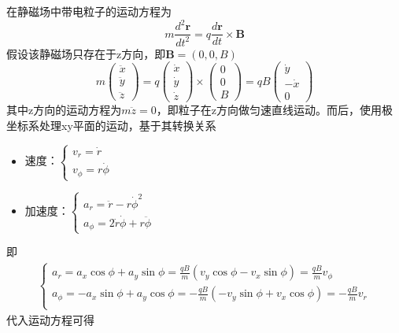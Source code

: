 在静磁场中带电粒子的运动方程为
\begin{equation*}
    m\frac{d^2\mathbf{r}}{dt^2}=q\frac{d\mathbf{r}}{dt}\times\mathbf{B}
\end{equation*}
假设该静磁场只存在于z方向，即$\mathbf{B}=(0,0,B)$
\begin{equation*}
    m\begin{pmatrix}
     \ddot{x}\\\ddot{y}\\\ddot{z}   
    \end{pmatrix}=
    q\begin{pmatrix}
        \dot{x}\\\dot{y}\\\dot{z}
    \end{pmatrix}\times
    \begin{pmatrix}
        0\\0\\B
    \end{pmatrix}=
    qB\begin{pmatrix}
        \dot{y}\\-\dot{x}\\0
    \end{pmatrix}
\end{equation*}
其中z方向的运动方程为$m\ddot{z}=0$，即粒子在z方向做匀速直线运动。而后，使用极坐标系处理xy平面的运动，基于其转换关系
\begin{itemize}
    \item 速度：$\begin{cases}v_r=\dot{r}\\v_\phi=r\dot{\phi}\end{cases}$
    \item 加速度：$\begin{cases}a_r=\ddot{r}-r\dot{\phi}^2\\a_\phi=2\dot{r}\dot{\phi}+r\ddot{\phi}\end{cases}$
\end{itemize}
即
\begin{align*}
    \begin{cases}
        a_r=a_x\cos\phi+a_y\sin\phi
        =\frac{qB}{m}\left(v_y\cos\phi-v_x\sin\phi\right)
        =\frac{qB}{m}v_\phi\\
        a_\phi=-a_x\sin\phi+a_y\cos\phi
        =-\frac{qB}{m}\left(-v_y\sin\phi+v_x\cos\phi\right)
        =-\frac{qB}{m}v_r\\
    \end{cases}
\end{align*}
代入运动方程可得
